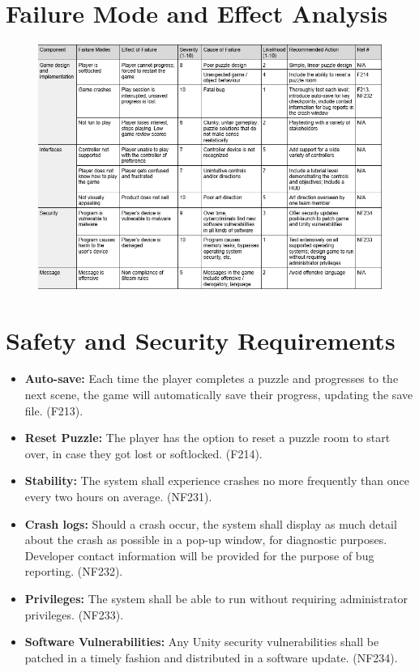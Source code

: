 \documentclass{article}
\begin{document}
\section{Failure Mode and Effect Analysis}

\begin{figure}[H]
	\includegraphics[width=\linewidth]{FMEA.png}
\end{figure}

\section{Safety and Security Requirements}

\begin{itemize}
\item{\textbf{Auto-save:} Each time the player completes a puzzle and progresses to the next scene, the game will automatically save their progress, updating the save file. (F213).}
\item{\textbf{Reset Puzzle:} The player has the option to reset a puzzle room to start over, in case they got lost or softlocked. (F214).}
\item{\textbf{Stability:} The system shall experience crashes no more frequently than once every two hours on average. (NF231).}
\item{\textbf{Crash logs:} Should a crash occur, the system shall display as much detail about the crash as possible in a pop-up window, for diagnostic purposes. Developer contact information will be provided for the purpose of bug reporting. (NF232).}
\item{\textbf{Privileges:} The system shall be able to run without requiring administrator privileges. (NF233).}
\item{\textbf{Software Vulnerabilities:} Any Unity security vulnerabilities shall be patched in a timely fashion and distributed in a software update. (NF234).}
\end{itemize}
\end{document}
